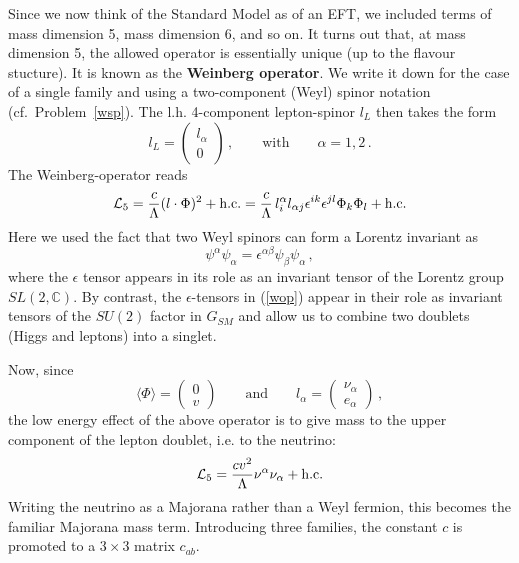 \documentclass[12pt]{article}
\newcommand{\be}{\begin{equation}}
\newcommand{\ee}{\end{equation}}
\numberwithin{equation}{section}
\begin{document}
Since we now think of the Standard Model as of an EFT, we included terms of mass dimension 5, mass dimension 6, and so on. It turns out that, at mass dimension 5, the allowed operator is essentially unique (up to the flavour stucture). It is known as the {\bf Weinberg operator}.  We write it down for the case of a single family and using a two-component (Weyl) spinor notation (cf.~Problem~\ref{wsp}). The l.h. 4-component lepton-spinor $l_L$ then takes the form
\be
l_L=\left(\begin{array}{c}l_\alpha\\ 0 \end{array}\right)\,,
\qquad \mbox{with}\qquad \alpha=1,2\,.
\ee
The Weinberg-operator reads
\be
{\cal L}_5=\frac{c}{\Lambda}(l\cdot\Phi)^2+\mbox{h.c.}=\frac{c}{\Lambda}\,l_i^\alpha l_{\alpha j}\epsilon^{ik}\epsilon^{jl}\Phi_k\Phi_l+\mbox{h.c.}\label{wop}
\ee
Here we used the fact that two Weyl spinors can form a Lorentz invariant as 
\be
\psi^\alpha\psi_\alpha=\epsilon^{\alpha\beta}\psi_\beta\psi_\alpha\,,
\ee
where the $\epsilon$ tensor appears in its role as an invariant tensor of the Lorentz group $SL(2,\mathbb{C})$. By contrast, the $\epsilon$-tensors in (\ref{wop}) appear in their role as invariant tensors of the $SU(2)$ factor in $G_{SM}$ and allow us to combine two doublets (Higgs and leptons) into a singlet.

Now, since 
\be
\langle \Phi\rangle =\left(\begin{array}{c}0\\ v \end{array}\right)
\qquad\mbox{and}\qquad 
l_\alpha = \left(\begin{array}{c}\nu_\alpha\\ e_\alpha \end{array}\right)\,,
\ee
the low energy effect of the above operator is to give mass to the upper component of the lepton doublet, i.e. to the neutrino:
\be
{\cal L}_5=\frac{cv^2}{\Lambda}\nu^\alpha\nu_\alpha+\mbox{h.c.}
\ee
Writing the neutrino as a Majorana rather than a Weyl fermion, this becomes the familiar Majorana mass term. Introducing three families, the constant $c$ is promoted to a $3\times 3$ matrix $c_{ab}$.  
\end{document}
